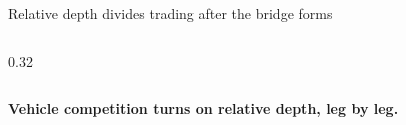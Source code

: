 \begin{frame}[label=depthdose]{Relative depth divides trading after the bridge forms}
\begin{columns}[T,totalwidth=0.97\textwidth]
\begin{column}{0.32\textwidth}
\end{column}
\end{columns}
\vspace{0.16cm}
{\large\bfseries\color{ucldark}\centering Vehicle competition turns on relative depth, leg by leg.\par}
\end{frame}

